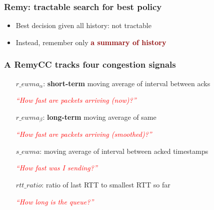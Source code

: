 \documentclass[svgnames]{beamer}
\begin{document}
\begin{frame}
\frametitle{Remy: tractable search for best policy}

\large

\begin{itemize}

\item Best decision given all history: not tractable

\item[]

\item Instead, remember only \textbf{\textcolor{DarkRed}{a summary of history}}

\end{itemize}

\end{frame}

\begin{frame}
\frametitle{A RemyCC tracks four congestion signals}

\large

\hspace{0.5 cm}\begin{minipage}{10.0 cm}
\begin{itemize}

\item[$r\_ewma_\alpha$:] \textbf{short-term} moving average of interval between acks

\textcolor{Red}{\textit{``How fast are packets arriving (now)?''}}

\item[$r\_ewma_\beta$:] \textbf{long-term} moving average of same

\textcolor{Red}{\textit{``How fast are packets arriving (smoothed)?''}}

\item[]

\item[$s\_ewma$:] moving average of interval between acked timestamps

\textcolor{Red}{\textit{``How fast was I sending?''}}

\item[]

\item[$rtt\_ratio$:] ratio of last RTT to smallest RTT so far

\textcolor{Red}{\textit{``How long is the queue?''}}

\end{itemize}
\end{minipage}

\end{frame}
\end{document}
